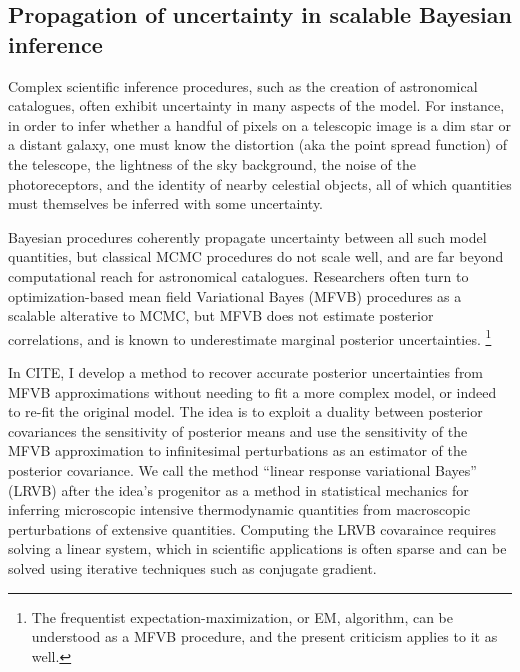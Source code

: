 \subsection*{Propagation of uncertainty in scalable Bayesian inference}

Complex scientific inference procedures, such as the creation of astronomical
catalogues, often exhibit uncertainty in many aspects of the model.  For
instance, in order to infer whether a handful of pixels on a telescopic image is
a dim star or a distant galaxy, one must know the distortion (aka the point
spread function) of the telescope, the lightness of the sky background, the
noise of the photoreceptors, and the identity of nearby celestial objects, all
of which quantities must themselves be inferred with some uncertainty.

Bayesian procedures coherently propagate uncertainty between all such model
quantities, but classical MCMC procedures do not scale well, and are far beyond
computational reach for astronomical catalogues.  Researchers often turn to
optimization-based mean field Variational Bayes (MFVB) procedures as a scalable
alterative to MCMC, but MFVB does not estimate posterior correlations, and is
known to underestimate marginal posterior uncertainties.
\footnote{The frequentist expectation-maximization, or EM, algorithm,
can be understood as a MFVB procedure, and the present criticism applies
to it as well.}

In CITE, I develop a method to recover accurate posterior uncertainties from
MFVB approximations without needing to fit a more complex model, or indeed to
re-fit the original model.  The idea is to exploit a duality between posterior
covariances the sensitivity of posterior means and use the sensitivity of the
MFVB approximation to infinitesimal perturbations as an estimator of the
posterior covariance.  We call the method ``linear response variational Bayes''
(LRVB) after the idea's progenitor as a method in statistical mechanics for
inferring microscopic intensive thermodynamic quantities from macroscopic
perturbations of extensive quantities.  Computing the LRVB covaraince requires
solving a linear system, which in scientific applications is often sparse and
can be solved using iterative techniques such as conjugate gradient.

